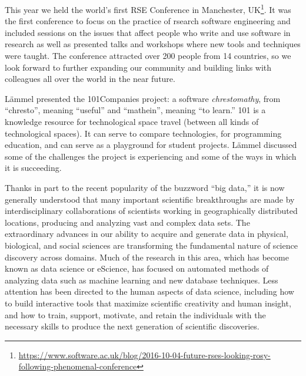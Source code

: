 \documentclass[a4paper,UKenglish]{dagrep}
\begin{document}
This year we held the world's first RSE Conference in Manchester, UK\footnote{\url{https://www.software.ac.uk/blog/2016-10-04-future-rses-looking-rosy-following-phenomenal-conference}}. It was the first conference to focus on the practice of rsearch software engineering and included sessions on the issues that affect people who write and use software in research as well as presented talks and workshops where new tools and techniques were taught. The conference attracted over 200 people from 14 countries, so we look forward to further expanding our community and building links with colleagues all over the world in the near future.


L\"ammel presented the 101Companies project: a software \emph{chrestomathy}, from ``chresto'', meaning ``useful'' and ``mathein'', meaning ``to learn.'' 101 is a knowledge resource for technological space travel (between all kinds of technological spaces). It can serve to compare technologies, for programming education, and can serve as a playground for student projects. L\"ammel discussed some of the challenges the project is experiencing and some of the ways in which it is succeeding.


Thanks in part to the recent popularity of the buzzword ``big data,'' it is now generally understood that many important scientific breakthroughs are made by interdisciplinary collaborations of scientists working in geographically distributed locations, producing and analyzing vast and complex data sets. The extraordinary advances in our ability to acquire and generate data in physical, biological, and social sciences are transforming the fundamental nature of science discovery across domains. Much of the research in this area, which has become known as data science or eScience, has focused on automated methods of analyzing data such as machine learning and new database techniques. Less attention has been directed to the human aspects of data science, including how to build interactive tools that maximize scientific creativity and human insight, and how to train, support, motivate, and retain the individuals with the necessary skills to produce the next generation of scientific discoveries.
\end{document}
